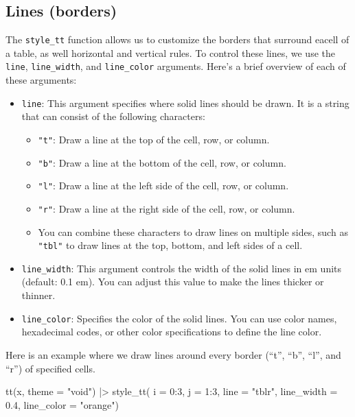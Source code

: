 \documentclass[
  letterpaper,
  DIV=11,
  numbers=noendperiod]{scrartcl}
\newenvironment{Shaded}{\begin{snugshade}}{\end{snugshade}}
\newcommand{\AttributeTok}[1]{\textcolor[rgb]{0.40,0.45,0.13}{#1}}
\newcommand{\DecValTok}[1]{\textcolor[rgb]{0.68,0.00,0.00}{#1}}
\newcommand{\FloatTok}[1]{\textcolor[rgb]{0.68,0.00,0.00}{#1}}
\newcommand{\FunctionTok}[1]{\textcolor[rgb]{0.28,0.35,0.67}{#1}}
\newcommand{\NormalTok}[1]{\textcolor[rgb]{0.00,0.23,0.31}{#1}}
\newcommand{\SpecialCharTok}[1]{\textcolor[rgb]{0.37,0.37,0.37}{#1}}
\newcommand{\StringTok}[1]{\textcolor[rgb]{0.13,0.47,0.30}{#1}}
\providecommand{\tightlist}{%
  \setlength{\itemsep}{0pt}\setlength{\parskip}{0pt}}\usepackage{longtable,booktabs,array}
\begin{document}
\subsection{Lines (borders)}\label{lines-borders}

The \texttt{style\_tt} function allows us to customize the borders that
surround eacell of a table, as well horizontal and vertical rules. To
control these lines, we use the \texttt{line}, \texttt{line\_width}, and
\texttt{line\_color} arguments. Here's a brief overview of each of these
arguments:

\begin{itemize}
\tightlist
\item
  \texttt{line}: This argument specifies where solid lines should be
  drawn. It is a string that can consist of the following characters:

  \begin{itemize}
  \tightlist
  \item
    \texttt{"t"}: Draw a line at the top of the cell, row, or column.
  \item
    \texttt{"b"}: Draw a line at the bottom of the cell, row, or column.
  \item
    \texttt{"l"}: Draw a line at the left side of the cell, row, or
    column.
  \item
    \texttt{"r"}: Draw a line at the right side of the cell, row, or
    column.
  \item
    You can combine these characters to draw lines on multiple sides,
    such as \texttt{"tbl"} to draw lines at the top, bottom, and left
    sides of a cell.
  \end{itemize}
\item
  \texttt{line\_width}: This argument controls the width of the solid
  lines in em units (default: 0.1 em). You can adjust this value to make
  the lines thicker or thinner.
\item
  \texttt{line\_color}: Specifies the color of the solid lines. You can
  use color names, hexadecimal codes, or other color specifications to
  define the line color.
\end{itemize}

Here is an example where we draw lines around every border (``t'',
``b'', ``l'', and ``r'') of specified cells.

\begin{Shaded}
\begin{Highlighting}[]
\FunctionTok{tt}\NormalTok{(x, }\AttributeTok{theme =} \StringTok{"void"}\NormalTok{) }\SpecialCharTok{|\textgreater{}}
    \FunctionTok{style\_tt}\NormalTok{(}
        \AttributeTok{i =} \DecValTok{0}\SpecialCharTok{:}\DecValTok{3}\NormalTok{,}
        \AttributeTok{j =} \DecValTok{1}\SpecialCharTok{:}\DecValTok{3}\NormalTok{,}
        \AttributeTok{line =} \StringTok{"tblr"}\NormalTok{,}
        \AttributeTok{line\_width =} \FloatTok{0.4}\NormalTok{,}
        \AttributeTok{line\_color =} \StringTok{"orange"}\NormalTok{)}
\end{Highlighting}
\end{Shaded}
\end{document}
